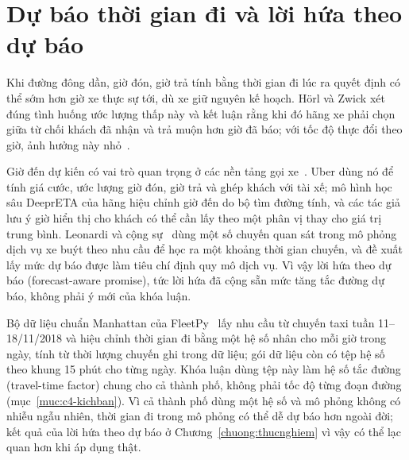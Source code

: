 \section{Dự báo thời gian đi và lời hứa theo dự báo}
\label{muc:c2-dubao}

Khi đường đông dần, giờ đón, giờ trả tính bằng thời gian đi lúc ra quyết định có thể sớm hơn giờ xe thực sự tới, dù
xe giữ nguyên kế hoạch. Hörl và Zwick xét đúng tình huống ước lượng thấp này và kết luận rằng khi đó hãng xe phải chọn
giữa từ chối khách đã nhận và trả muộn hơn giờ đã báo; với tốc độ thực đổi theo giờ, ảnh hưởng này nhỏ~\cite{horl2022}.

Giờ đến dự kiến có vai trò quan trọng ở các nền tảng gọi xe~\cite{hu2022}. Uber dùng nó để tính giá cước, ước lượng
giờ đón, giờ trả và ghép khách với tài xế; mô hình học sâu DeeprETA của hãng hiệu chỉnh giờ đến do bộ tìm đường tính,
và các tác giả lưu ý giờ hiển thị cho khách có thể cần lấy theo một phân vị thay cho giá trị trung bình. Leonardi và
cộng sự~\cite{leonardi2024} dùng một số chuyến quan sát trong mô phỏng dịch vụ xe buýt theo nhu cầu để học ra một
khoảng thời gian chuyến, và đề xuất lấy mức dự báo được làm tiêu chí định quy mô dịch vụ. Vì vậy lời hứa theo dự báo
(forecast-aware promise), tức lời hứa đã cộng sẵn mức tăng tắc đường dự báo, không phải ý mới của khóa luận.

Bộ dữ liệu chuẩn Manhattan của FleetPy~\cite{engelhardt2026} lấy nhu cầu từ chuyến taxi tuần 11--18/11/2018 và hiệu
chỉnh thời gian đi bằng một hệ số nhân cho mỗi giờ trong ngày, tính từ thời lượng chuyến ghi trong dữ liệu; gói dữ
liệu còn có tệp hệ số theo khung 15 phút cho từng ngày. Khóa luận dùng tệp này làm hệ số tắc đường (travel-time
factor) chung cho cả thành phố, không phải tốc độ từng đoạn đường (mục~\ref{muc:c4-kichban}). Vì cả thành phố dùng
một hệ số và mô phỏng không có nhiễu ngẫu nhiên, thời gian đi trong mô phỏng có thể dễ dự báo hơn ngoài đời; kết quả
của lời hứa theo dự báo ở Chương~\ref{chuong:thucnghiem} vì vậy có thể lạc quan hơn khi áp dụng thật.

